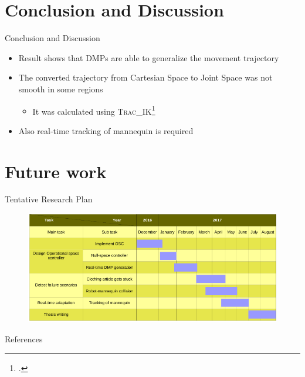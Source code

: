 \documentclass[aspectratio=43,11pt,xcolor={dvipsnames}]{beamer}
\begin{document}
\section{Conclusion and Discussion}
\begin{frame}{Conclusion and Discussion}
	\linespread{1.5}
		
	\begin{itemize}
		\item Result shows that DMPs are able to generalize the movement trajectory
		\item The converted trajectory from Cartesian Space to Joint Space was not smooth in some regions
		      \begin{itemize}
		      	\item It was calculated using \textsc{Trac\_IK}\footcite{beeson2015trac}
		      \end{itemize}
		\item Also real-time tracking of mannequin is required
	\end{itemize}
\end{frame}

\section{Future work}
\begin{frame}{Tentative Research Plan}
	
	\begin{figure}
		\includegraphics[width=\textwidth]{timeline}
	\end{figure}
\end{frame}

\begin{frame}[noframenumbering]{References}
	\nocite{*}
	\hspace*{0.5cm}
	\begin{minipage}{\dimexpr\textwidth-1cm\relax}
		\printbibliography
	\end{minipage}
\end{frame}



\end{document}

